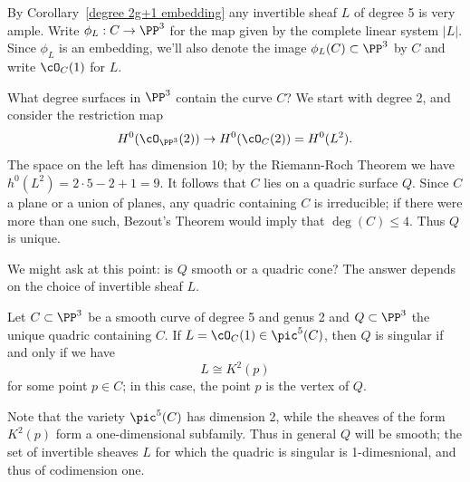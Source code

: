 By Corollary~\ref{degree 2g+1 embedding} any invertible sheaf $L$ of degree 5 is very ample. 
Write $\phi_L : C \to \PP^3$ for the map given by the complete linear system $|L|$. Since $\phi_L$ is an embedding, we'll also denote the image $\phi_L(C) \subset \PP^3$ by $C$ and write $\cO_C(1)$ for $L$.

What degree surfaces in $\PP^3$ contain the curve $C$? We start with degree 2, and consider the restriction map
$$
H^0(\cO_{\PP^3}(2)) \to H^0(\cO_C(2)) = H^0(L^2).
$$
The space on the left has dimension 10; by the Riemann-Roch Theorem we have $h^0(L^2) = 2\cdot5 - 2 + 1 = 9$. It follows that $C$ lies on a quadric surface $Q$. Since $C$ a plane or a union of planes, any quadric containing $C$ is irreducible; if there were more than one such, Bezout's Theorem would imply that $\deg(C) \leq 4$. Thus $Q$ is unique.

We might ask at this point: is $Q$ smooth or a quadric cone? The answer depends on the choice of invertible sheaf $L$. 

\begin{proposition}\label{genus 2 embedding}
Let $C \subset \PP^3$ be a smooth curve of degree 5 and genus 2 and $Q \subset \PP^3$ the unique quadric containing $C$. If $L = \cO_C(1) \in \pic^5(C)$, then $Q$ is singular if and only if we have
$$
L \cong K^2(p)
$$
for some point $p \in C$; in this case, the point $p$ is the vertex of $Q$.
\end{proposition}

Note that the variety $\pic^5(C)$ has dimension 2, while the sheaves of the form $K^2(p)$ form a one-dimensional subfamily. Thus in general $Q$ will be smooth; the set of invertible sheaves $L$
for which the quadric is singular is 1-dimesnional, and thus of codimension one.

